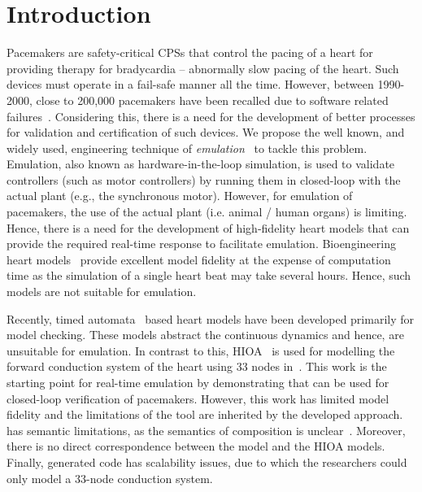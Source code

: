 \section{Introduction}

Pacemakers are safety-critical \acp{CPS} that control the pacing of a
heart for providing therapy for bradycardia -- abnormally slow pacing of
the heart. Such devices must operate in a fail-safe manner all the
time. However, between 1990-2000, close to 200,000 pacemakers have been
recalled due to software related
failures~\cite{alemzadeh13}. Considering this, there is a need for the
development of better processes for validation and certification of such
devices. We propose the well known, and widely used, engineering
technique of \emph{emulation}~\cite{patel2015survey} to tackle this
problem. Emulation, also known as hardware-in-the-loop simulation, is
used to validate controllers (such as motor controllers) by running them
in closed-loop with the actual plant (e.g., the synchronous motor).
However, for emulation of pacemakers, the use of the actual plant
(i.e. animal / human organs) is limiting. Hence, there is a need for the
development of high-fidelity heart models that can provide the required
real-time response to facilitate emulation. Bioengineering heart
models~\cite{Trayanova2014} provide excellent model fidelity at the
expense of computation time as the simulation of a single heart beat may
take several hours. Hence, such models are not suitable for emulation.

Recently, timed automata~\cite{zhihao12} based heart models have been
developed primarily for model checking. These models abstract the
continuous dynamics and hence, are unsuitable for emulation. In contrast
to this, \acf{HIOA}~\cite{alur2015book, raskin05} is used for modelling
the forward conduction system of the heart using 33 nodes
in~\cite{chen14}. This work is the starting point for real-time
emulation by demonstrating that \simulink can be used for closed-loop
verification of pacemakers. However, this work has limited model
fidelity and the limitations of the tool \simulink are inherited by the
developed approach. \simulink has semantic limitations, as the semantics
of composition is unclear~\cite{need-some-ref}. Moreover, there is no
direct correspondence between the \simulink model and the \ac{HIOA}
models. Finally, \simulink generated code has scalability issues, due to
which the researchers could only model a 33-node conduction system.


